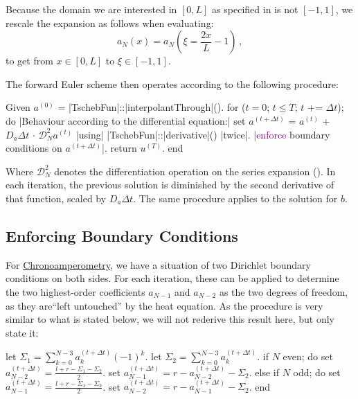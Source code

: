 \documentclass{prettytex/ox/mmsc-special-topic}
\begin{document}
  Because the domain we are interested in $[0, L]$ as specified in  is not $[-1, 1]$, we rescale the expansion as follows when evaluating:
  $$a_N(x) = a_N\left(\xi = \frac{2 x}{L} - 1\right)\,,$$
  to get from $x \in [0, L]$ to $\xi \in [-1, 1]$.

  The forward Euler scheme then operates according to the following procedure:
  \begin{algorithm}[language=pseudo, caption={\centering A Spectral Method in the Chebyshev Basis}, basicstyle=\footnotesize]
Given $a^{(0)}$ = |\color{themecolor3}TschebFun|::|\color{themecolor2}interpolantThrough|().
for ($t = 0$; $t \le T$; $t$ += $\Delta t$); do
  |\rm\color{gray}Behaviour according to the differential equation:|
  set $a^{(t+\Delta t)}$ = $a^{(t)}$ + $D_a \Delta t$ $\cdot$ $\mathcal{D}_N^2 a^{(t)}$ |\rm\color{gray}using| |\color{themecolor3}TschebFun|::|\color{themecolor2}derivative|() |\rm\color{gray}twice|.
  |\rm \textcolor{purple}{enforce} boundary conditions on $a^{(t+\Delta t)}$|.
  return $u^{(T)}$.
end
  \end{algorithm}
  Where $\mathcal{D}_N^2$ denotes the differentiation operation on the series expansion ().
  In each iteration, the previous solution is diminished by the second derivative of that function, scaled by $D_a \Delta t$.
  The same procedure applies to the solution for $b$.

  \subsection{Enforcing Boundary Conditions}
  For \underline{Chronoamperometry}, we have a situation of two Dirichlet boundary conditions on both sides. For each iteration, these can be applied to determine the two highest-order coefficients $a_{N-1}$ and $a_{N-2}$ as the two degrees of freedom, as they are``left untouched'' by the heat equation.
  As the procedure is very similar to what is stated below, we will not rederive this result here, but only state it:
  \begin{algorithm}[language=pseudo, caption={\centering Enforcing Dirichlet Boundary Conditions on both sides}, basicstyle=\footnotesize]
let $\Sigma_1 = \sum_{k=0}^{N-3} a_k^{(t+\Delta t)} (-1)^k$.
let $\Sigma_2 = \sum_{k=0}^{N-3} a_k^{(t+\Delta t)}$.
if $N$ even; do
  set $a_{N-2}^{(t+\Delta t)} = \frac{l+r-\Sigma_1-\Sigma_2}{2}$.
  set $a_{N-1}^{(t+\Delta t)} = r - a_{N-2}^{(t+\Delta t)} - \Sigma_2$.
else if $N$ odd; do
  set $a_{N-1}^{(t+\Delta t)} = \frac{l+r-\Sigma_1-\Sigma_2}{2}$.
  set $a_{N-2}^{(t+\Delta t)} = r - a_{N-1}^{(t+\Delta t)} - \Sigma_2$.
end
  \end{algorithm}
\end{document}
